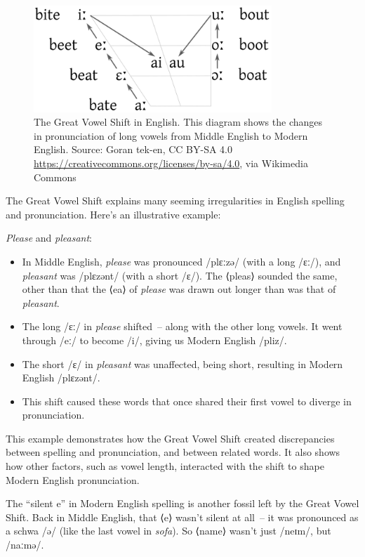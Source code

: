 \begin{figure}[h]
    \centering
    \includegraphics[width=0.8\textwidth]{figures/Great_Vowel_Shift2c.png}
    \caption{The Great Vowel Shift in English. This diagram shows the changes in pronunciation of long vowels from Middle English to Modern English. Source: Goran tek-en, CC BY-SA 4.0 \url{https://creativecommons.org/licenses/by-sa/4.0}, via Wikimedia Commons}
    \label{fig:great-vowel-shift}
\end{figure}

The Great Vowel Shift explains many seeming irregularities in English spelling and pronunciation. Here's an illustrative example:

\textit{Please} and \textit{pleasant}:
\begin{itemize}[noitemsep]
  \item In Middle English, \textit{please} was pronounced /plɛːzə/ (with a long /ɛː/), and \textit{pleasant} was /plɛzənt/ (with a short /ɛ/). The ⟨pleas⟩ sounded the same, other than that the ⟨ea⟩ of \textit{please} was drawn out longer than was that of \textit{pleasant}.
  \item The long /ɛː/ in \textit{please} shifted~-- along with the other long vowels. It went through /eː/ to become /i/, giving us Modern English /pliz/.
  \item The short /ɛ/ in \textit{pleasant} was unaffected, being short, resulting in Modern English /plɛzənt/.
  \item This shift caused these words that once shared their first vowel to diverge in pronunciation.
\end{itemize}

This example demonstrates how the Great Vowel Shift created discrepancies between spelling and pronunciation, and between related words. It also shows how other factors, such as vowel length, interacted with the shift to shape Modern English pronunciation.

The ``silent e'' in Modern English spelling is another fossil left by the Great Vowel Shift. Back in Middle English, that ⟨e⟩ wasn't silent at all~-- it was pronounced as a schwa /ə/ (like the last vowel in \textit{sofa}). So ⟨name⟩ wasn't just /neɪm/, but /naːmə/.

